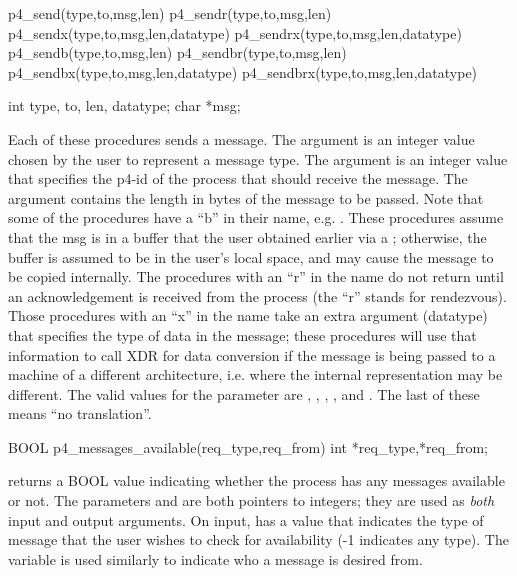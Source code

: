 \begin{example}
p4_send(type,to,msg,len)
p4_sendr(type,to,msg,len)
p4_sendx(type,to,msg,len,datatype)
p4_sendrx(type,to,msg,len,datatype)
p4_sendb(type,to,msg,len)
p4_sendbr(type,to,msg,len)
p4_sendbx(type,to,msg,len,datatype)
p4_sendbrx(type,to,msg,len,datatype)

int type, to, len, datatype;
char *msg;
\end{example}
\noindent

Each of these procedures sends a message.  The  argument is an
integer value chosen by the user to represent a message type.  The 
argument is an integer value that specifies the p4-id of the process that
should receive the message.  The  argument contains the length in
bytes of the message to be passed.  Note that some of the procedures have a
``b'' in their name, e.g.  .  These procedures assume that the
msg is in a buffer that the user obtained earlier via a ;
otherwise, the buffer is assumed to be in the user's local space, and may
cause the message to be copied internally.  The procedures with an ``r'' in
the name do not return until an acknowledgement is received from the 
process (the ``r'' stands for rendezvous).  Those procedures with an ``x'' in
the name take an extra argument (datatype) that specifies the type of data in
the message; these procedures will use that information to call XDR for data
conversion if the message is being passed to a machine of a different
architecture, i.e. where the internal representation may be different.  The
valid values for the  parameter are ,
, , , and .  The last of
these means ``no translation''.


\begin{example}
BOOL p4_messages_available(req_type,req_from)
int *req_type,*req_from;
\end{example}
\noindent
returns a BOOL value indicating whether the process has any messages available
or not.  The parameters  and  are both pointers
to integers; they are used as {\em both} input and output arguments.  On input,
 has a value that indicates the type of message that the user
wishes to check for availability (-1 indicates any type).  The variable
 is used similarly to indicate who a message is desired from.

